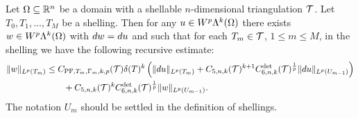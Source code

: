 \documentclass[10pt,a4paper]{article}
\newcommand{\mwl}[1]{{\color{red}#1}}
\begin{document}
\begin{theorem}\label{theorem:poincarefriedrichsestimate:exterior}
    Let $\Omega \subseteq {\mathbb R}^{n}$ be a domain with a shellable $n$-dimensional triangulation ${\mathcal T}$.
    Let $T_0, T_1, \dots, T_M$ be a shelling.
    Then for any $u \in W^{p}\Lambda^{k}(\Omega)$ 
    there exists $w \in W^{p}\Lambda^{k}(\Omega)$ with $d w = d u$ 
    and such that for each $T_{m} \in {\mathcal T}$, $1 \leq m \leq M$, in the shelling
    we have the following recursive estimate: 
    \begin{align*}
        \| w \|_{L^{p}(T_{m})}
        &
        \leq  
        C_{{\rm PF},T_{m},\Gamma_{m},k,p}({\mathcal T}) 
        {\delta}(T)^{k} 
        \left( 
            \| d u      \|_{L^{p}(T_{m})} 
            +
            C_{5,n,k}({\mathcal T})^{k+1} 
            C^{\det}_{6,n,k}({\mathcal T})^{\frac 1 p} 
            \| d u \|_{L^{p}(U_{m-1})}
        \right)
        \\&\qquad
        + 
        C_{5,n,k}({\mathcal T})^{k} 
        C^{\det}_{6,n,k}({\mathcal T})^{\frac 1 p} 
        \| w \|_{L^{p}(U_{m-1})}
        .
    \end{align*}
    \mwl{The notation $U_m$ should be settled in the definition of shellings.}
\end{theorem}
\end{document}
